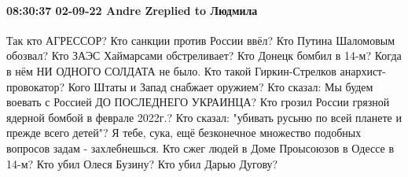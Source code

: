 \paragraph{08:30:37 02-09-22 Andre Zreplied to Людмила}

Так кто АГРЕССОР?
Кто санкции против России ввёл?
Кто Путина Шаломовым обозвал?
Кто ЗАЭС Хаймарсами обстреливает?
Кто Донецк бомбил в 14-м? Когда в нём НИ ОДНОГО СОЛДАТА не было.
Кто такой Гиркин-Стрелков анархист-провокатор?
Кого Штаты и Запад снабжает оружием?
Кто сказал: Мы будем воевать с Россией ДО ПОСЛЕДНЕГО УКРАИНЦА?
Кто грозил России грязной ядерной бомбой в феврале 2022г.?
Кто сказал: "убивать русьню по всей планете и прежде всего детей"?
Я тебе, сука, ещё безконечное множество подобных вопросов задам - захлебнешься.
Кто сжег людей в Доме Проысоюзов в Одессе в 14-м?
Кто убил Олеся Бузину?
Кто убил Дарью Дугову?


